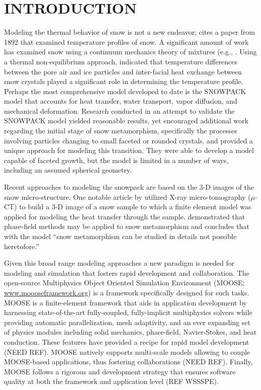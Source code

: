 \section{INTRODUCTION}
Modeling the thermal behavior of snow is not a new endeavor; \citet{lachapelle1960} cites a paper from 1892 that examined temperature profiles of snow. A significant amount of work has examined snow using a continuum mechanics theory of mixtures (e.g., \citet{adams1989, brown1999}.  Using a thermal non-equilibrium approach, \citet{bartelt2004} indicated that temperature differences between the pore air and ice particles and inter-facial heat exchange between snow crystals played a significant role in determining the temperature profile. Perhaps the most comprehensive model developed to date is the SNOWPACK model \citep{lehning1999, bartelt2002, lehning2002a, lehning2002b} that accounts for heat transfer, water transport, vapor diffusion, and mechanical deformation.  Research conducted in an attempt to validate the SNOWPACK model yielded reasonable results, yet \citet{fierz2001} encouraged additional work regarding the initial stage of snow metamorphism, specifically the processes involving particles changing to small faceted or rounded crystals. \citet{miller2003} and \citet{miller2009} provided a unique approach for modeling this transition. They were able to develop a model capable of faceted growth, but the model is limited in a number of ways, including an assumed spherical geometry.

Recent approaches to modeling the snowpack are based on the 3-D images of the snow micro-structure.  One notable article by \citet{kaempfer2005} utilized X-ray micro-tomography ($\mu$-CT) to build a 3-D image of a snow sample to which a finite element model was applied for modeling the heat transfer through the sample. \citet{kaempfer2009phase} demonstrated that phase-field methods may be applied to snow metamorphism and concludes that with the model ``snow metamorphism can be studied in details not possible heretofore.''

Given this broad range modeling approaches a new paradigm is needed for modeling and simulation that fosters rapid development and collaboration. The open-source Multiphysics Object Oriented Simulation Environment (MOOSE; \url{www.moooseframework.org}) is a framework specifically designed for such tasks. MOOSE is a finite-element framework that aids in application development by harnessing state-of-the-art fully-coupled, fully-implicit multiphysics solvers while providing automatic parallelization, mesh adaptivity, and an ever expanding set of physics modules including solid mechanics, phase-field, Navier-Stokes, and heat conduction. These features have provided a recipe for rapid model development (NEED REF). MOOSE natively supports multi-scale models allowing to couple MOOSE-based applications, thus fostering collaborations (NEED REF). Finally, MOOSE follows a rigorous and development strategy that ensures software quality at both the framework and application level (REF WSSSPE).

